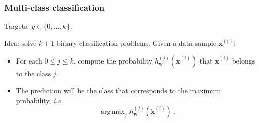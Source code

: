 \documentclass{beamer}
\DeclareMathOperator*{\argmax}{arg\,max}
\begin{document}
	\begin{frame}
		\frametitle{Multi-class classification}
		
		Targets: $y \in \{0, \dots, k\}$.
		
		\vspace{5mm}
		
		Idea: solve $k+1$ binary classification problems. Given a data sample $\bm{x}^{(i)}$:
		\begin{itemize}
			\item For each $0\leq j \leq k$, compute the probability $h^{(j)}_{\bm{w}}(\tilde{\bm{x}}^{(i)})$ that $\tilde{\bm{x}}^{(i)}$ belongs to the class $j$.
			\item The prediction will be the class that corresponds to the maximum probability, \textit{i.e.} 
			$$\argmax_j h^{(j)}_{\bm{w}}(\tilde{\bm{x}}^{(i)})\ .$$
		\end{itemize}
		
		
	\end{frame}
\end{document}
